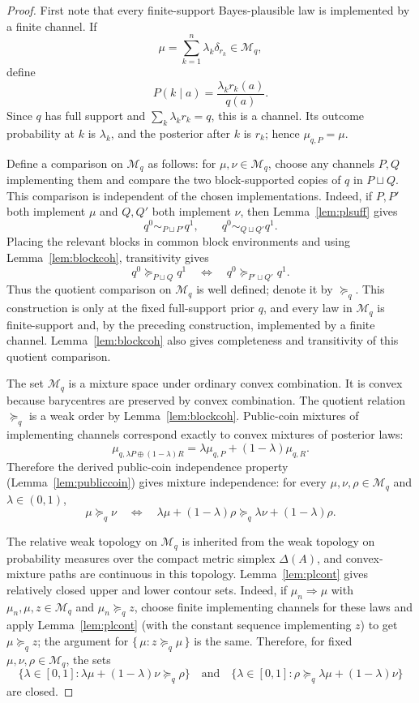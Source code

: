 \documentclass[11pt,a4paper]{article}
\theoremstyle{definition}
\newcommand{\1}{\mathbf 1}
\begin{document}
\begin{proof}
First note that every finite-support Bayes-plausible law is implemented by a finite channel.  If
\[
\mu=\sum_{k=1}^n\lambda_k\delta_{r_k}\in\mathcal M_q,
\]
define
\[
P(k\mid a)=\frac{\lambda_k r_k(a)}{q(a)}.
\]
Since $q$ has full support and $\sum_k\lambda_k r_k=q$, this is a channel.  Its outcome probability at $k$ is
$\lambda_k$, and the posterior after $k$ is $r_k$; hence $\mu_{q,P}=\mu$.

Define a comparison on $\mathcal M_q$ as follows: for $\mu,\nu\in\mathcal M_q$, choose any channels $P,Q$ implementing
them and compare the two block-supported copies of $q$ in $P\sqcup Q$.  This comparison is independent of the chosen
implementations.  Indeed, if $P,P'$ both implement $\mu$ and $Q,Q'$ both implement $\nu$, then
Lemma~\ref{lem:plsuff} gives
\[
q^0\sim_{P\sqcup P'}q^1,
\qquad
q^0\sim_{Q\sqcup Q'}q^1.
\]
Placing the relevant blocks in common block environments and using Lemma~\ref{lem:blockcoh}, transitivity gives
\[
q^0\succeq_{P\sqcup Q}q^1
\quad\Longleftrightarrow\quad
q^0\succeq_{P'\sqcup Q'}q^1.
\]
Thus the quotient comparison on $\mathcal M_q$ is well defined; denote it by $\succeq_q$.  This construction is only at
the fixed full-support prior $q$, and every law in $\mathcal M_q$ is finite-support and, by the preceding construction,
implemented by a finite channel.  Lemma~\ref{lem:blockcoh} also gives completeness and transitivity of this quotient
comparison.

The set $\mathcal M_q$ is a mixture space under ordinary convex combination.  It is convex because barycentres are
preserved by convex combination.  The quotient relation $\succeq_q$ is a weak order by Lemma~\ref{lem:blockcoh}.
Public-coin mixtures of implementing channels correspond exactly to convex mixtures of posterior laws:
\[
\mu_{q,\lambda P\oplus(1-\lambda)R}
=
\lambda\mu_{q,P}+(1-\lambda)\mu_{q,R}.
\]
Therefore the derived public-coin independence property (Lemma~\ref{lem:publiccoin}) gives mixture independence: for every $\mu,\nu,\rho\in\mathcal M_q$ and
$\lambda\in(0,1)$,
\[
\mu\succeq_q\nu
\quad\Longleftrightarrow\quad
\lambda\mu+(1-\lambda)\rho
\succeq_q
\lambda\nu+(1-\lambda)\rho.
\]

The relative weak topology on $\mathcal M_q$ is inherited from the weak topology on probability measures over the compact
metric simplex $\Delta(A)$, and convex-mixture paths are continuous in this topology.  Lemma~\ref{lem:plcont} gives
relatively closed upper and lower contour sets.  Indeed, if
$\mu_n\Rightarrow\mu$ with $\mu_n,\mu,z\in\mathcal M_q$ and $\mu_n\succeq_q z$, choose finite implementing channels for
these laws and apply Lemma~\ref{lem:plcont} (with the constant sequence implementing $z$) to get $\mu\succeq_q z$; the
argument for $\{\,\mu:z\succeq_q\mu\,\}$ is the
same.  Therefore, for fixed $\mu,\nu,\rho\in\mathcal M_q$, the sets
\[
\{\lambda\in[0,1]:\lambda\mu+(1-\lambda)\nu\succeq_q\rho\}
\quad\text{and}\quad
\{\lambda\in[0,1]:\rho\succeq_q\lambda\mu+(1-\lambda)\nu\}
\]
are closed.


\end{proof}
\end{document}
